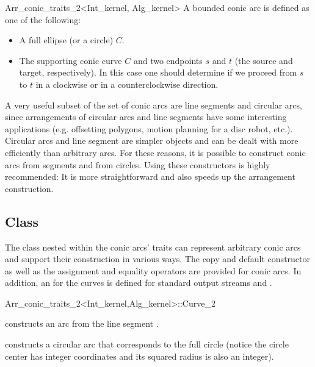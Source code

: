 \begin{ccRefClass}{Arr_conic_traits_2<Int_kernel, Alg_kernel>}
    A bounded conic arc is defined as one of the following:
    \begin{itemize}
    \item A full ellipse (or a circle) $C$.
    \item The supporting conic curve $C$ and two endpoints $s$ and $t$ (the 
    source and target, respectively). In this case one should determine if
    we proceed from $s$ to $t$ in a clockwise or in a counterclockwise
    direction.
    \end{itemize}

    A very useful subset of the set of conic arcs are line segments and 
    circular arcs, since arrangements of circular arcs and line segments have 
    some interesting applications (e.g. offsetting polygons, motion planning 
    for a disc robot, etc.). Circular arcs and line segment are simpler 
    objects and can be dealt with more efficiently than arbitrary arcs. 
    For these reasons, it is possible to construct conic arcs from segments 
    and from circles. Using these constructors is highly recommended: It is 
    more straightforward and also speeds up the arrangement construction.


\ccIsModel
     

%
\subsection*{Class }

The  class nested within the conic arcs' traits can represent
arbitrary conic arcs and support their construction in various ways. The copy 
and default constructor as well as the assignment and equality operators are 
provided for conic arcs. In addition, an  for the curves is 
defined for standard output streams and .

\begin{ccClass}{Arr_conic_traits_2<Int_kernel,Alg_kernel>::Curve_2}
    \ccCreation

  {constructs an arc from the line segment .}

  {constructs a circular arc that corresponds to the full circle 
   (notice the circle center has integer coordinates and its squared radius
   is also an integer).}


\end{ccClass}
\end{ccRefClass}
